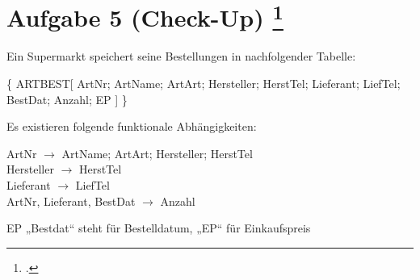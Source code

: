 \documentclass{lehramt-informatik-aufgabe}
\begin{document}

\section{Aufgabe 5 (Check-Up)
\footcite{db:ab:6}
}

\newcommand{\tmptt}[1]{%
  {%
    \small%
    \ttfamily%
    \noindent%
    #1
  }
}

Ein Supermarkt speichert seine Bestellungen in nachfolgender Tabelle:

\bigskip

\tmptt{%
  \{
    ARTBEST[
      ArtNr;
      ArtName;
      ArtArt;
      Hersteller;
      HerstTel;
      Lieferant;
      LiefTel;
      BestDat;
      Anzahl;
      EP
    ]
  \}
}

\bigskip

\noindent
Es existieren folgende funktionale Abhängigkeiten:

\bigskip

\tmptt{%
  ArtNr $\rightarrow$ ArtName; ArtArt; Hersteller; HerstTel\\
  Hersteller $\rightarrow$ HerstTel\\
  Lieferant $\rightarrow$ LiefTel\\
  ArtNr, Lieferant, BestDat $\rightarrow$ Anzahl
}

\bigskip
\noindent
EP „Bestdat“ steht für Bestelldatum, „EP“ für Einkaufspreis
\end{document}
